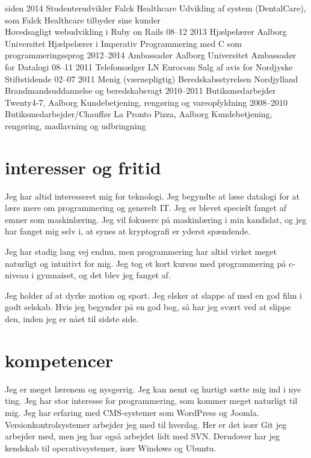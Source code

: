 \documentclass[]{friggeri-cv}
\begin{document}
\begin{entrylist}
  \entry
    {siden 2014}
    {Studenterudvikler}
    {Falck Healthcare}
    {Udvikling af system (DentalCare), som Falck Healthcare tilbyder sine kunder \\
     Hovedsagligt webudvikling i Ruby on Rails}
  \entry
    {08–12 2013}
    {Hjælpelærer}
    {Aalborg Universitet}
    {Hjælpelærer i Imperativ Programmering med C som programmeringssprog}
  \entry
    {2012–2014}
    {Ambassadør}
    {Aalborg Universitet}
    {Ambassadør for Datalogi}
  \entry
    {08–11 2011}
    {Telefonsælger}
    {LN Eurocom}
    {Salg af avis for Nordjyske Stiftstidende}
  \entry
    {02–07 2011}
    {Menig (værnepligtig)}
    {Beredskabsstyrelsen Nordjylland}
    {Brandmandsuddannelse og beredskabsvagt}
  \entry
    {2010–2011}
    {Butiksmedarbejder}
    {Twenty4-7, Aalborg}
    {Kundebetjening, rengøring og vareopfyldning}
  \entry
    {2008–2010}
    {Butiksmedarbejder/Chauffør}
    {La Pronto Pizza, Aalborg}
    {Kundebetjening, rengøring, madlavning og udbringning}
\end{entrylist}

\section{interesser og fritid}

Jeg har altid interesseret mig for teknologi. Jeg begyndte at læse datalogi for at lære mere om programmering og generelt IT. Jeg er blevet specielt fanget af emner som maskinlæring. Jeg vil fokusere på maskinlæring i min kandidat, og jeg har fanget mig selv i, at synes at kryptografi er yderst spændende. 

Jeg har stadig lang vej endnu, men programmering har altid virket meget naturligt og intuitivt for mig. Jeg tog et kort kursus med programmering på c-niveau i gymnaiset, og det blev jeg fanget af.

Jeg holder af at dyrke motion og sport. Jeg elsker at slappe af med en god film i godt selskab. Hvis jeg begynder på en god bog, så har jeg svært ved at slippe den, inden jeg er nået til sidste side.

\newpage

\section{kompetencer}
Jeg er meget lærenem og nysgerrig. Jeg kan nemt og hurtigt sætte mig ind i nye ting. Jeg har stor interesse for programmering, som kommer meget naturligt til mig.
Jeg har erfaring med CMS-systemer som WordPress og Joomla. Versionkontrolsystemer arbejder jeg med til hverdag. Her er det især Git jeg arbejder med, men jeg har også arbejdet lidt med SVN.
Derudover har jeg kendskab til operativsystemer, især Windows og Ubuntu.
\end{document}
